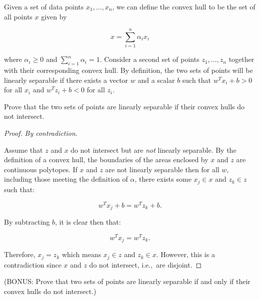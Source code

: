 \begin{problem}
Given a set of data points $x_1,\ldots,x_n$, we can define the convex hull to be the set of all points $x$ given by

\[x = \sum_{i=1}^{n} \alpha_i x_i \]

\noindent
where $\alpha_{i} \geq 0$ and $\sum_{i=1}^{n} \alpha_i = 1$. Consider a second set of points $z_1,\ldots,z_n$ together with their corresponding convex hull. By definition, the two sets of points will be linearly separable if there exists a vector $w$ and a scalar $b$ such that $w^{T}x_i + b > 0$ for all $x_i$ and $w^{T}z_i + b < 0$ for all $z_i$.

Prove that the two sets of points are linearly separable if their convex hulls do not intersect.
\end{problem}

\begin{proof}
  \textit{By contradiction}.

  Assume that $z$ and $x$ do not intersect but are \textit{not} linearly separable.  By the definition of a convex hull, the boundaries of the areas enclosed by $x$ and $z$ are continuous polytopes.  If $x$ and $z$ are not linearly separable then for all $w$, including those meeting the definition of $\alpha$, there exists some $x_j \in x$ and $z_k \in z$ such that:

  \[w^{T}x_j + b = w^{T}z_k +b \text{.} \]

\noindent
By subtracting $b$, it is clear then that:

\[w^{T}x_j  = w^{T}z_k \text{.} \]

\noindent
Therefore, $x_j = z_k$ which means $x_j\in z$ and $z_k \in x$.  However, this is a contradiction since $x$ and $z$ do not intersect, i.e.,~are disjoint.

\end{proof}

\begin{subproblem}
  (BONUS\@: Prove that two sets of points are linearly separable if and only if their convex hulls do not intersect.)
\end{subproblem}
